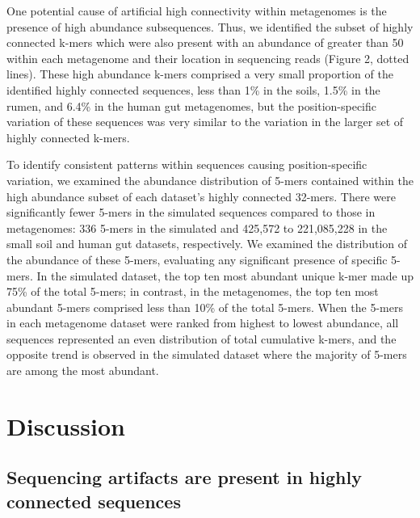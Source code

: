 \documentclass[10pt]{article}
\begin{document}
One potential cause of artificial high connectivity within metagenomes
is the presence of high abundance subsequences.  Thus, we identified the
subset of highly connected k-mers which were also present with an
abundance of greater than 50 within each metagenome and their location
in sequencing reads (Figure 2, dotted lines).  These high abundance
k-mers comprised a very small proportion of the identified highly
connected sequences, less than 1\% in the soils, 1.5\% in the rumen,
and 6.4\% in the human gut metagenomes, but the position-specific
variation of these sequences was very similar to the variation in the
larger set of highly connected k-mers.

To identify consistent patterns within sequences causing
position-specific variation, we examined the abundance distribution of
5-mers contained within the high abundance subset of each dataset's
highly connected 32-mers.  There were significantly fewer 5-mers in
the simulated sequences compared to those in metagenomes: 336 5-mers
in the simulated and 425,572 to 221,085,228 in the small soil and
human gut datasets, respectively.  We examined the distribution of the
abundance of these 5-mers, evaluating any significant presence of
specific 5-mers.  In the simulated dataset, the top ten most abundant
unique k-mer made up 75\% of the total 5-mers; in contrast, in the
metagenomes, the top ten most abundant 5-mers comprised less than 10\%
of the total 5-mers.  When the 5-mers in each metagenome dataset were
ranked from highest to lowest abundance, all sequences represented an
even distribution of total cumulative k-mers, and the opposite trend
is observed in the simulated dataset where the majority of 5-mers are
among the most abundant.

\section*{Discussion}

\subsection*{Sequencing artifacts are present in highly connected sequences}
\end{document}
